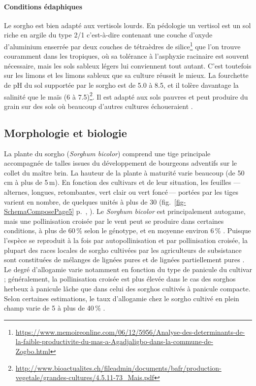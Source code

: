 \documentclass[a4paper,11pt]{article}
\begin{document}
\paragraph{Conditions édaphiques}
Le sorgho est bien adapté aux vertisols lourds. En pédologie un
vertisol est un sol riche en argile du type 2/1 c'est-à-dire contenant
une couche d'oxyde d'aluminium enserrée par deux couches de tétraèdres
de
silice\footnote{\url{https://www.memoireonline.com/06/12/5956/Analyse-des-determinants-de-la-faible-productivite-du-mas-a-Agadjaligbo-dans-la-commune-de-Zogbo.html}}
que l'on trouve couramment dans les tropiques, où sa tolérance à
l'asphyxie racinaire est souvent nécessaire, mais les sols sableux
légers lui conviennent tout autant. C'est toutefois sur les limons et
les limons sableux que sa culture réussit le mieux. La fourchette de
pH du sol supportée par le sorgho est de 5.0 à 8.5, et il tolère
davantage la salinité que le maïs (6 à
7.5)\footnote{\url{http://www.bioactualites.ch/fileadmin/documents/bafr/production-vegetale/grandes-cultures/4.5.11-73_Mais.pdf}}. Il
est adapté aux sols pauvres et peut produire du grain sur des sols où
beaucoup d'autres cultures échoueraient \cite{BARRO_KONDOMBO_2010}.


\subsection{Morphologie et biologie} La plante du sorgho
(\emph{Sorghum bicolor}) comprend une tige principale accompagnée de
talles issues du développement de bourgeons adventifs sur le collet du
maître brin. La hauteur de la plante à maturité varie beaucoup (de
50\,cm à plus de 5\,m). En fonction des cultivars et de leur
situation, les feuilles ---\,alternes, longues, retombantes, vert
clair ou vert foncé\,--- portées par les tiges varient en nombre, de
quelques unités à plus de 30 (fig.~\ref{fig-SchemaComposePage5}
p.~\pageref{fig-SchemaComposePage5}, ). Le
\emph{Sorghum bicolor} est principalement autogame, mais une
pollinisation croisée par le vent peut se produire dans certaines
conditions, à plus de 60\,\% selon le génotype, et en moyenne environ
6\,\% \cite{Ellstrand_1983,
  House85,Pedersen_1998,Schertz_1980}. Puisque l'espèce se reproduit à
la fois par autopollinisation et par pollinisation croisée, la plupart
des races locales de sorgho cultivées par les agriculteurs de
subsistance sont constituées de mélanges de lignées pures et de
lignées partiellement pures \cite{SINGH_1997}. Le degré d'allogamie
varie notamment en fonction du type de panicule du cultivar ;
généralement, la pollinisation croisée est plus élevée dans le cas des
sorghos herbeux à panicule lâche que dans celui des sorghos cultivés à
panicule compacte. Selon certaines estimations, le taux d'allogamie
chez le sorgho cultivé en plein champ varie de 5 à plus de 40\,\%
\cite{Barnaud_2008, DJE_2004, Doggett_1988,
  Ellstrand_1983,Schmidt_2006}.
\end{document}
